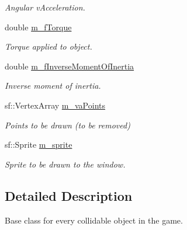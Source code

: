 \begin{DoxyCompactItemize}
\begin{DoxyCompactList}\small\item\em Angular v\+Acceleration. \end{DoxyCompactList}\item 
\hypertarget{class_collidable_a84f79454b1dac54f7b9042660d89e8ca}{}double \hyperlink{class_collidable_a84f79454b1dac54f7b9042660d89e8ca}{m\+\_\+f\+Torque}\label{class_collidable_a84f79454b1dac54f7b9042660d89e8ca}

\begin{DoxyCompactList}\small\item\em Torque applied to object. \end{DoxyCompactList}\item 
\hypertarget{class_collidable_aef9f604795e30d09737aee26beb128ae}{}double \hyperlink{class_collidable_aef9f604795e30d09737aee26beb128ae}{m\+\_\+f\+Inverse\+Moment\+Of\+Inertia}\label{class_collidable_aef9f604795e30d09737aee26beb128ae}

\begin{DoxyCompactList}\small\item\em Inverse moment of inertia. \end{DoxyCompactList}\item 
\hypertarget{class_collidable_a13a62d6d9fb69397c5ad03e6ec1c3b2d}{}sf\+::\+Vertex\+Array \hyperlink{class_collidable_a13a62d6d9fb69397c5ad03e6ec1c3b2d}{m\+\_\+va\+Points}\label{class_collidable_a13a62d6d9fb69397c5ad03e6ec1c3b2d}

\begin{DoxyCompactList}\small\item\em Points to be drawn (to be removed) \end{DoxyCompactList}\item 
\hypertarget{class_collidable_a5392bcb0ef0fef2e60b68a447e4d0ae7}{}sf\+::\+Sprite \hyperlink{class_collidable_a5392bcb0ef0fef2e60b68a447e4d0ae7}{m\+\_\+sprite}\label{class_collidable_a5392bcb0ef0fef2e60b68a447e4d0ae7}

\begin{DoxyCompactList}\small\item\em Sprite to be drawn to the window. \end{DoxyCompactList}\end{DoxyCompactItemize}


\subsection{Detailed Description}
Base class for every collidable object in the game. 

